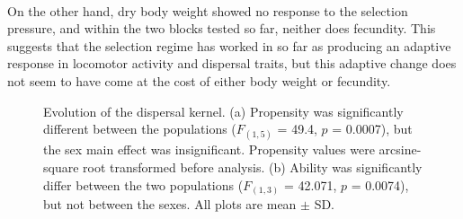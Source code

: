 \documentclass[12pt,onecolumn,twoside]{article}
\begin{document}
	\paragraph{\empty}On the other hand, dry body weight showed no response to the selection pressure, and within the two blocks tested so far, neither does fecundity. This suggests that the selection regime has worked in so far as producing an adaptive response in locomotor activity and dispersal traits, but this adaptive change does not seem to have come at the cost of either body weight or fecundity.
	\begin{figure}
		\centering
		\begin{subfigure}{0.7\textwidth}
			\scalebox{0.5}{}
			\subcaption{\empty}
		\end{subfigure}
		\begin{subfigure}{0.7\textwidth}
			\scalebox{0.5}{}
			\subcaption{\empty}
		\end{subfigure}
		\caption{\label{fig1} Evolution of the dispersal kernel. (a) Propensity was significantly different between the populations ($F_{(1, 5)}$ = 49.4, $p$ = 0.0007), but the sex main effect was insignificant. Propensity values were arcsine-square root transformed before analysis. (b) Ability was significantly differ between the two populations ($F_{(1, 3)}$ = 42.071, $p$ = 0.0074), but not between the sexes. All plots are mean $\pm$ SD. }
	\end{figure}
\end{document}
